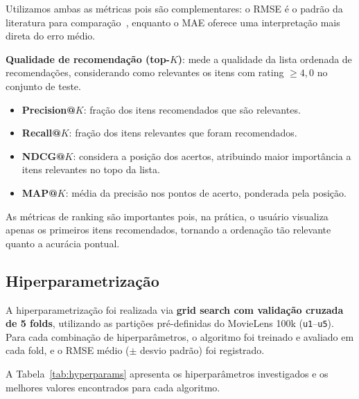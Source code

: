 \documentclass[sigconf,nonacm]{acmart}
\begin{document}
Utilizamos ambas as métricas pois são complementares: o RMSE é o padrão da
literatura para comparação~\cite{koren2009}, enquanto o MAE oferece uma
interpretação mais direta do erro médio.

\textbf{Qualidade de recomendação (top-$K$)}: mede a qualidade da lista
ordenada de recomendações, considerando como relevantes os itens com
rating $\geq 4{,}0$ no conjunto de teste.
\begin{itemize}
  \item \textbf{Precision@$K$}: fração dos itens recomendados que são relevantes.
  \item \textbf{Recall@$K$}: fração dos itens relevantes que foram recomendados.
  \item \textbf{NDCG@$K$}: considera a posição dos acertos, atribuindo maior
    importância a itens relevantes no topo da lista.
  \item \textbf{MAP@$K$}: média da precisão nos pontos de acerto, ponderada
    pela posição.
\end{itemize}

As métricas de ranking são importantes pois, na prática, o usuário visualiza
apenas os primeiros itens recomendados, tornando a ordenação tão relevante
quanto a acurácia pontual.

\subsection{Hiperparametrização}

A hiperparametrização foi realizada via \textbf{grid search com validação
cruzada de 5 folds}, utilizando as partições pré-definidas do MovieLens 100k
(\texttt{u1}--\texttt{u5}). Para cada combinação de hiperparâmetros, o
algoritmo foi treinado e avaliado em cada fold, e o RMSE médio ($\pm$ desvio
padrão) foi registrado.

A Tabela~\ref{tab:hyperparams} apresenta os hiperparâmetros investigados e os
melhores valores encontrados para cada algoritmo.
\end{document}
